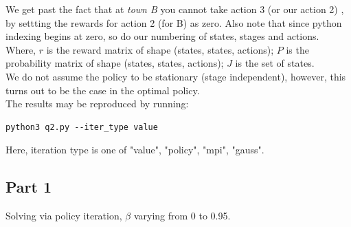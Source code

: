 We get past the fact that at \textit{town B } you cannot take action 3 (or our action 2) , by settting the rewards for action 2 (for B) as zero. Also note that since python indexing begins at zero, so do our numbering of states, stages and actions.\\

Where, $r$ is the reward matrix of shape (states, states, actions);
$P$ is the probability matrix of shape (states, states, actions);
$J$ is the set of states.\\

We do not assume the policy to be stationary (stage independent), however, this turns out to be the case in the optimal policy.\\

The results may be reproduced by running:
\begin{lstlisting}[numbers = none]
python3 q2.py --iter_type value
\end{lstlisting}

Here, iteration type is one of "value", "policy", "mpi", "gauss".

\subsection{Part 1}

Solving via policy iteration, $\beta$ varying from 0 to 0.95. \\

